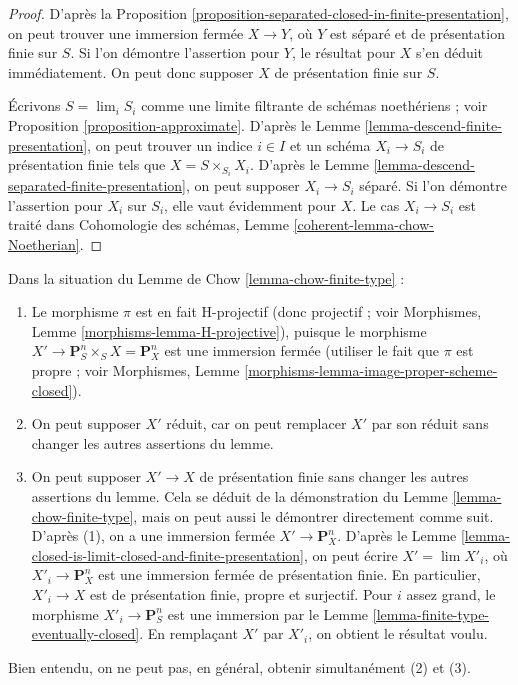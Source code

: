 \begin{proof}
D'après la Proposition \ref{proposition-separated-closed-in-finite-presentation},
on peut trouver une immersion fermée $X \to Y$, où $Y$ est séparé
et de présentation finie sur $S$. Si l'on démontre l'assertion
pour $Y$, le résultat pour $X$ s'en déduit immédiatement. On peut donc supposer
$X$ de présentation finie sur $S$.

\medskip\noindent
Écrivons $S = \lim_i S_i$ comme une limite filtrante de schémas noethériens ; voir
Proposition \ref{proposition-approximate}. D'après le
Lemme \ref{lemma-descend-finite-presentation}, on peut
trouver un indice $i \in I$ et un schéma $X_i \to S_i$ de présentation finie
tels que $X = S \times_{S_i} X_i$.
D'après le Lemme \ref{lemma-descend-separated-finite-presentation},
on peut supposer $X_i \to S_i$ séparé.
Si l'on démontre l'assertion pour
$X_i$ sur $S_i$, elle vaut évidemment pour $X$. Le cas
$X_i \to S_i$ est traité dans
Cohomologie des schémas, Lemme \ref{coherent-lemma-chow-Noetherian}.
\end{proof}

\begin{remark}
\label{remark-chow-finite-type}
Dans la situation du Lemme de Chow \ref{lemma-chow-finite-type} :
\begin{enumerate}
\item Le morphisme $\pi$ est en fait H-projectif (donc projectif ; voir
Morphismes, Lemme \ref{morphisms-lemma-H-projective}),
puisque le morphisme $X' \to \mathbf{P}^n_S \times_S X = \mathbf{P}^n_X$
est une immersion fermée (utiliser le fait que $\pi$ est propre ; voir
Morphismes, Lemme \ref{morphisms-lemma-image-proper-scheme-closed}).
\item On peut supposer $X'$ réduit, car on peut remplacer $X'$ par
son réduit sans changer les autres assertions du lemme.
\item On peut supposer $X' \to X$ de présentation finie
sans changer les autres assertions du lemme. Cela se déduit
de la démonstration du Lemme \ref{lemma-chow-finite-type}, mais on peut aussi le démontrer
directement comme suit. D'après (1), on a une immersion fermée
$X' \to \mathbf{P}^n_X$. D'après le
Lemme \ref{lemma-closed-is-limit-closed-and-finite-presentation}, on peut écrire
$X' = \lim X'_i$, où $X'_i \to \mathbf{P}^n_X$ est une immersion
fermée de présentation finie. En particulier, $X'_i \to X$ est
de présentation finie, propre et surjectif. Pour
$i$ assez grand, le morphisme $X'_i \to \mathbf{P}^n_S$ est une immersion par le
Lemme \ref{lemma-finite-type-eventually-closed}. En remplaçant
$X'$ par $X'_i$, on obtient le résultat voulu.
\end{enumerate}
Bien entendu, on ne peut pas, en général, obtenir simultanément (2) et (3).
\end{remark}

